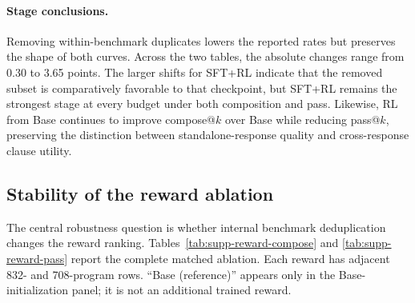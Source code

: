 \documentclass[10pt]{article}
\begin{document}
\paragraph{Stage conclusions.}
Removing within-benchmark duplicates lowers the reported rates but preserves the
shape of both curves.  Across the two tables, the absolute changes range from
0.30 to 3.65 points.  The larger shifts for SFT+RL indicate that the removed
subset is comparatively favorable to that checkpoint, but SFT+RL remains the
strongest stage at every budget under both composition and pass.  Likewise,
RL from Base continues to improve compose@\(k\) over Base while reducing
pass@\(k\), preserving the distinction between standalone-response quality
and cross-response clause utility.

\subsection{Stability of the reward ablation}

The central robustness question is whether internal benchmark deduplication changes the reward
ranking.  Tables~\ref{tab:supp-reward-compose} and
\ref{tab:supp-reward-pass} report the complete matched ablation.  Each reward
has adjacent 832- and 708-program rows.  ``Base (reference)'' appears only in
the Base-initialization panel; it is not an additional trained reward.
\end{document}
